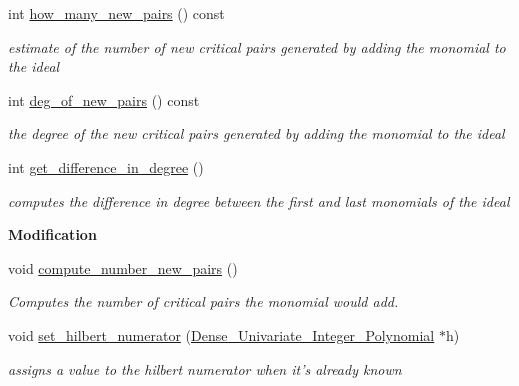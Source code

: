 \begin{Indent}
\begin{DoxyCompactItemize}
\mbox{\label{group___g_b_computation_afb9a43c24f2d0405d1c60e12983c8003}} 
int \hyperlink{group___g_b_computation_afb9a43c24f2d0405d1c60e12983c8003}{how\+\_\+many\+\_\+new\+\_\+pairs} () const
\begin{DoxyCompactList}\small\item\em estimate of the number of new critical pairs generated by adding the monomial to the ideal \end{DoxyCompactList}\item 
\mbox{\label{group___g_b_computation_a68c0ece8174abdb6d2955d63f04cd437}} 
int \hyperlink{group___g_b_computation_a68c0ece8174abdb6d2955d63f04cd437}{deg\+\_\+of\+\_\+new\+\_\+pairs} () const
\begin{DoxyCompactList}\small\item\em the degree of the new critical pairs generated by adding the monomial to the ideal \end{DoxyCompactList}\item 
\mbox{\label{group___g_b_computation_addbeaeb67edfe33d4b4d71d7a4aa1aac}} 
int \hyperlink{group___g_b_computation_addbeaeb67edfe33d4b4d71d7a4aa1aac}{get\+\_\+difference\+\_\+in\+\_\+degree} ()
\begin{DoxyCompactList}\small\item\em computes the difference in degree between the first and last monomials of the ideal \end{DoxyCompactList}\end{DoxyCompactItemize}
\end{Indent}
\begin{Indent}\textbf{ Modification}\par
\begin{DoxyCompactItemize}
\item 
\mbox{\label{group___g_b_computation_abedc9cad9413fc7727e1b93d6eea16af}} 
void \hyperlink{group___g_b_computation_abedc9cad9413fc7727e1b93d6eea16af}{compute\+\_\+number\+\_\+new\+\_\+pairs} ()
\begin{DoxyCompactList}\small\item\em Computes the number of critical pairs the monomial would add. \end{DoxyCompactList}\item 
\mbox{\label{group___g_b_computation_a20bb441439236bcce2d9e87b8486553f}} 
void \hyperlink{group___g_b_computation_a20bb441439236bcce2d9e87b8486553f}{set\+\_\+hilbert\+\_\+numerator} (\hyperlink{group__polygroup_class_dense___univariate___integer___polynomial}{Dense\+\_\+\+Univariate\+\_\+\+Integer\+\_\+\+Polynomial} $\ast$h)
\begin{DoxyCompactList}\small\item\em assigns a value to the hilbert numerator when it's already known \end{DoxyCompactList}\end{DoxyCompactItemize}
\end{Indent}

